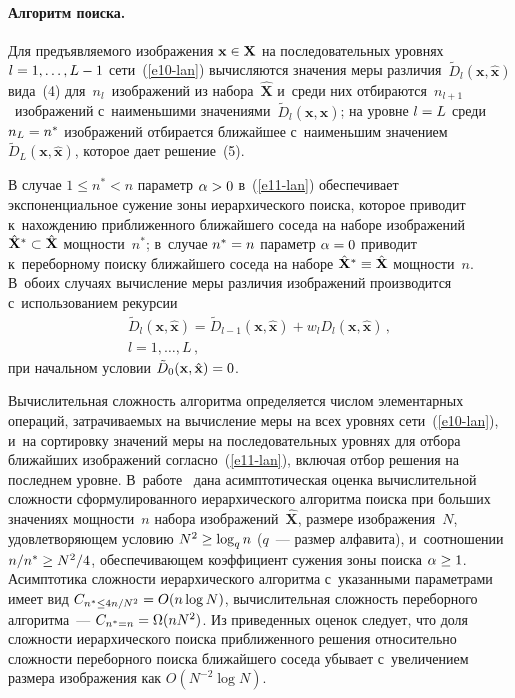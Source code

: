 \begin{multicols}{2}
  \paragraph*{Алгоритм поиска.} Для предъявляемого изображения 
$\mathbf{x}\hm\in\mathbf{X}$ на последовательных уровнях $l\hm=1,\ldots , 
L\hm-1$ сети~(\ref{e10-lan}) вычисляются значения меры 
различия~$\tilde{D}_l(\mathbf{x}, \hat{\mathbf{x}})$ вида~(4) 
для~$n_l$~изображений из набора~$\hat{\mathbf{X}}$ и~среди них 
отбираются~$n_{l+1}$~изображений с~наименьшими 
значениями~$\tilde{D}_l(\mathbf{x}, \hat{\mathbf{x}})$; на уровне $l\hm=L$ 
среди $n_L\hm=n^*$ изображений отбирается ближайшее с~наименьшим 
значением~$\tilde{D}_L(\mathbf{x}, \hat{\mathbf{x}})$, которое дает 
решение~(5). 
  
  В случае $1\leq n^*<n$ параметр $\alpha\hm>0$ в~(\ref{e11-lan}) 
обеспечивает экспоненциальное сужение зоны иерархического поиска, которое 
приводит к~нахождению приближенного ближайшего соседа на наборе 
изоб\-ра\-же\-ний $\hat{\mathbf{X}}^*\hm\subset \hat{\mathbf{X}}$ мощ\-ности~$n^*$; 
в~случае $n^*\hm=n$ параметр $\alpha\hm=0$ приводит к~переборному поиску 
ближайшего соседа на наборе $\hat{\mathbf{X}}^*\hm\equiv \hat{\mathbf{X}}$ 
мощности~$n$. В~обоих случаях вычисление меры различия изображений 
производится с~использованием рекурсии 
  \begin{multline}
  \tilde{D}_l\left(\mathbf{x},\hat{\mathbf{x}}\right)=\tilde{D}_{l-1} 
\left(\mathbf{x},\hat{\mathbf{x}}\right) +w_l D_l 
\left(\mathbf{x},\hat{\mathbf{x}}\right)\,,\\ l=1,\ldots , L\,,
  \label{e12-lan}
  \end{multline}
при начальном условии $\tilde{D}_0 (\mathbf{x},\hat{\mathbf{x}})\hm=0$.

  Вычислительная сложность алгоритма опре\-де\-ляется числом элементарных 
операций, затрачиваемых на вычисление меры на всех уровнях\linebreak  
сети~(\ref{e10-lan}), и~на сортировку значений меры на последовательных 
уровнях для отбора ближайших изоб\-ра\-же\-ний согласно~(\ref{e11-lan}), включая 
отбор решения на последнем уровне. В~работе~\cite{7-lan} дана 
асимптотическая оценка вычислительной сложности сформулированного 
иерархического алгоритма поиска при больших значениях мощности~$n$ 
набора изображений~$\hat{\mathbf{X}}$, размере изображения~$N$, 
удовлетворяющем условию $N^2\hm\geq \log_q n$ ($q$~--- размер алфавита), 
и~соотношении $n/n^*\hm\geq N^2/4$, обеспечивающем коэффициент сужения 
зоны поиска $\alpha\hm\geq 1$. Асимптотика сложности иерархического 
алгоритма с~указанными параметрами имеет вид $C_{n^*\leq 4n/N^2}\hm= 
O(n\log N)$, вычислительная сложность переборного алгоритма~--- 
$C_{n^*=n}\hm= \Omega(nN^2)$. Из приведенных оценок следует, что доля 
сложности иерархического поиска приближенного решения относительно 
сложности переборного поиска ближайшего соседа убывает с~увеличением 
размера изображения как $O(N^{-2}\log N)$. 
  

\end{multicols}
